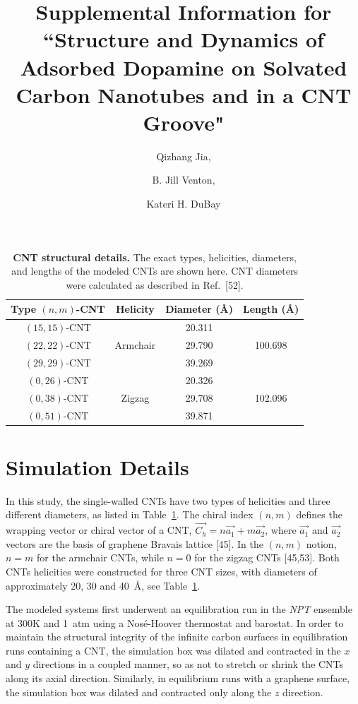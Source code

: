 \documentclass[journal=jpcbfk, layout=twocolumn, manuscript=article]{achemso}
\title{Supplemental Information for ``Structure and Dynamics of Adsorbed Dopamine on Solvated Carbon Nanotubes and in a CNT Groove"}
\author{Qizhang Jia, \and B. Jill Venton, \and Kateri H. DuBay}
\affiliation{Department of Chemistry, University of Virginia, Charlottesville, Virginia 22904}
\date{}
\begin{document}
\maketitle

\begin{table}[!hb]
    \footnotesize
    \centering
    \begin{tabular}{c|ccc}
            \hline
            Type $(n,m)$-CNT & Helicity & Diameter (\AA) & Length (\AA) \\
            \hline
            $(15,15)$-CNT & \multirow{3}{*}{Armchair}    & 20.311 & \multirow{3}{*}{100.698}	\\
            $(22,22)$-CNT &     & 29.790      \\
            $(29,29)$-CNT &     & 39.269      \\
            \hline  
            $(0,26)$-CNT & \multirow{3}{*}{Zigzag}  & 20.326 & \multirow{3}{*}{102.096}	      \\
            $(0,38)$-CNT &   & 29.708      \\
            $(0,51)$-CNT &   & 39.871      \\
            \hline
    \end{tabular}
    \caption{\textbf{CNT structural details.} The exact types, helicities, diameters, and lengths of the modeled CNTs are shown here. CNT diameters were calculated as described in Ref.~[52]. %
    }
    \label{tab:Methods_model_surfaces}
\end{table}

\section{Simulation Details}

In this study, the single-walled CNTs have two types of helicities and three different diameters, as listed in Table~\ref{tab:Methods_model_surfaces}. The chiral index $(n,m)$ defines the wrapping vector or chiral vector of a CNT, $\vec{C_h} = n\vec{a_1} + m\vec{a_2}$, where $\vec{a_1}$ and $\vec{a_2}$ vectors are the basis of graphene Bravais lattice [45]. %
In the $(n,m)$ notion, $n=m$ for the armchair CNTs, while $n=0$ for the zigzag CNTs [45,53]. %
Both CNTs helicities were constructed for three CNT sizes, with diameters of approximately 20, 30 and 40~\AA, see Table~\ref{tab:Methods_model_surfaces}.

The modeled systems first underwent an equilibration run in the \textit{NPT} ensemble at 300K and 1~atm using a Nos\'{e}-Hoover thermostat and barostat. In order to maintain the structural integrity of the infinite carbon surfaces in equilibration runs containing a CNT, the simulation box was dilated and contracted in the $x$ and $y$ directions in a coupled manner, so as not to stretch or shrink the CNTs along its axial direction. Similarly, in equilibrium runs with a graphene surface, the simulation box was dilated and contracted only along the $z$ direction.
\end{document}
